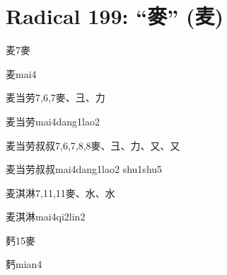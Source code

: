 
\section*{Radical 199: ``⿆'' (麦)}

\begin{entry}{麦}{7}{⿆}
  \begin{phonetics}{麦}{mai4}
  \end{phonetics}
\end{entry}

\begin{entry}{麦当劳}{7,6,7}{⿆、⼹、⼒}
  \begin{phonetics}{麦当劳}{mai4dang1lao2}
  \end{phonetics}
\end{entry}

\begin{entry}{麦当劳叔叔}{7,6,7,8,8}{⿆、⼹、⼒、⼜、⼜}
  \begin{phonetics}{麦当劳叔叔}{mai4dang1lao2 shu1shu5}
  \end{phonetics}
\end{entry}

\begin{entry}{麦淇淋}{7,11,11}{⿆、⽔、⽔}
  \begin{phonetics}{麦淇淋}{mai4qi2lin2}
  \end{phonetics}
\end{entry}

\begin{entry}{麫}{15}{⿆}
  \begin{phonetics}{麫}{mian4}
  \end{phonetics}
\end{entry}


